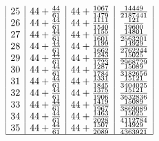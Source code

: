 \documentclass{amsart}
\begin{document}
$$\begin{array}{|c|c|c|c|}
25&44+\frac{44}{61}&44+\frac{1067}{1479}&\frac{14449}{2187441}\\
26&44+\frac{44}{61}&44+\frac{1111}{1540}&\frac{121}{19600}\\
27&44+\frac{44}{61}&44+\frac{1155}{1601}&\frac{14801}{2563201}\\
28&44+\frac{44}{61}&44+\frac{1199}{1662}&\frac{14929}{2762244}\\
29&44+\frac{44}{61}&44+\frac{1243}{1723}&\frac{15025}{2968729}\\
30&44+\frac{44}{61}&44+\frac{1287}{1784}&\frac{15089}{3182656}\\
31&44+\frac{44}{61}&44+\frac{1331}{1845}&\frac{15121}{3404025}\\
32&44+\frac{44}{61}&44+\frac{1375}{1906}&\frac{15121}{3632836}\\
33&44+\frac{44}{61}&44+\frac{1419}{1967}&\frac{15089}{3869089}\\
34&44+\frac{44}{61}&44+\frac{1463}{2028}&\frac{15025}{4112784}\\
35&44+\frac{44}{61}&44+\frac{1507}{2089}&\frac{14929}{4363921}\\
\hline
\end{array}$$
\end{document}
